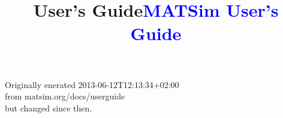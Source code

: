 \documentclass[a4paper,11pt]{report}
\title{User's Guide}
\newcommand{\NextFile}[1]{}
\begin{document}
\NextFile{index.html}

\title{\textcolor{blue}{\sf MATSim User's Guide}}
\maketitle

\tableofcontents

Originally enerated 2013-06-12T12:13:34+02:00
\\from matsim.org/docs/userguide
\\but changed since then.
















\vfill\eject




\end{document}
